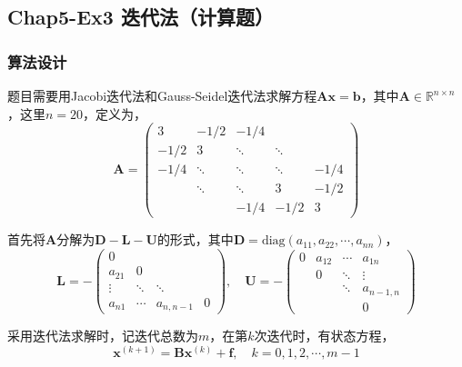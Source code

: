 \documentclass[12pt,a4paper]{article}
\begin{document}
\subsection{Chap5-Ex3 迭代法（计算题）}

\subsubsection{算法设计}

题目需要用Jacobi迭代法和Gauss-Seidel迭代法求解方程$\boldsymbol{Ax} = \boldsymbol{b}$，其中$\boldsymbol{A}\in \mathbb{R}^{n\times n}$，这里$n=20$，定义为，
\begin{equation}
    \boldsymbol{A} = \left(
        \begin{matrix}
            3 & -1/2 & -1/4 & & \\
            -1/2 & 3 & \ddots & \ddots & \\
            -1/4 & \ddots & \ddots & \ddots & -1/4 \\
            & \ddots & \ddots & 3 & -1/2 \\
            & & -1/4 & -1/2 & 3
        \end{matrix}
    \right)
\end{equation}

首先将$\boldsymbol{A}$分解为$\boldsymbol{D} - \boldsymbol{L} - \boldsymbol{U}$的形式，其中$\boldsymbol{D} = \mathrm{diag}(a_{11}, a_{22}, \cdots, a_{nn})$，
\begin{equation}
    \boldsymbol{L} = -\left(
    \begin{matrix}
        0 &  &  &  \\
        a_{21} & 0 & & \\
        \vdots & \ddots & \ddots & \\
        a_{n1} & \cdots & a_{n,n-1} & 0
    \end{matrix}    
    \right), \quad
    \boldsymbol{U} = -\left(
    \begin{matrix}
        0 & a_{12} & \cdots & a_{1n} \\
        & 0 & \ddots & \vdots \\
        & & \ddots & a_{n-1,n} \\
        & & & 0
    \end{matrix}
    \right)
\end{equation}

采用迭代法求解时，记迭代总数为$m$，在第$k$次迭代时，有状态方程，
\begin{equation}
    \boldsymbol{x}^{(k+1)} = \boldsymbol{B} \boldsymbol{x}^{(k)} + \boldsymbol{f}, \quad k = 0,1,2,\cdots,m-1
\end{equation}
\end{document}
